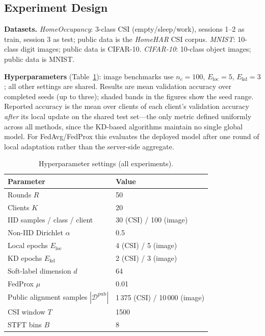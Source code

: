 \documentclass[conference]{IEEEtran}
\begin{document}
\subsection{Experiment Design}

\textbf{Datasets.}
\emph{HomeOccupancy}: 3-class CSI (empty/sleep/work),
sessions 1--2 as train, session 3 as test; public data is the
\emph{HomeHAR} CSI corpus.
\emph{MNIST}: 10-class digit images; public data is CIFAR-10.
\emph{CIFAR-10}: 10-class object images; public data is MNIST.

\textbf{Hyperparameters} (Table~\ref{tab:hyperparam}): image benchmarks
use $n_c{=}100$, $E_{\text{loc}}{=}5$, $E_{\text{kd}}{=}3$; all other
settings are shared.  Results are mean validation accuracy over completed seeds (up to
three); shaded bands in the figures show the seed range.
Reported accuracy is the mean over clients of each client's validation
accuracy \emph{after} its local update on the shared test set---the only
metric defined uniformly across all methods, since the KD-based
algorithms maintain no single global model.  For FedAvg/FedProx this
evaluates the deployed model after one round of local adaptation rather
than the server-side aggregate.

\begin{table}[t]
\centering\small
\caption{Hyperparameter settings (all experiments).}
\label{tab:hyperparam}
\setlength{\tabcolsep}{4pt}
\begin{tabular}{@{}ll@{}}
\toprule
\textbf{Parameter} & \textbf{Value}\\
\midrule
Rounds $R$ & 50 \\
Clients $K$ & 20 \\
IID samples / class / client & 30 (CSI) / 100 (image) \\
Non-IID Dirichlet $\alpha$ & 0.5 \\
Local epochs $E_{\text{loc}}$ & 4 (CSI) / 5 (image) \\
KD epochs $E_{\text{kd}}$ & 2 (CSI) / 3 (image) \\
Soft-label dimension $d$ & 64 \\
FedProx $\mu$ & 0.01 \\
Public alignment samples $|\mathcal{D}^{\text{pub}}|$ & 1\,375 (CSI) / 10\,000 (image) \\
CSI window $T$ & 1500 \\
STFT bins $B$ & 8 \\
\bottomrule
\end{tabular}
\end{table}
\end{document}

